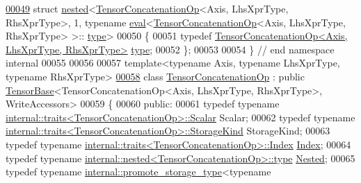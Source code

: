\begin{DoxyCode}
\hyperlink{struct_eigen_1_1internal_1_1nested_3_01_tensor_concatenation_op_3_01_axis_00_01_lhs_xpr_type_00_387f0c29001361c8d2e2fed7054a319e}{00049} \textcolor{keyword}{struct }\hyperlink{struct_eigen_1_1internal_1_1nested}{nested}<\hyperlink{class_eigen_1_1_tensor_concatenation_op}{TensorConcatenationOp}<Axis, LhsXprType, RhsXprType>, 1, typename 
      \hyperlink{struct_eigen_1_1internal_1_1eval}{eval}<\hyperlink{class_eigen_1_1_tensor_concatenation_op}{TensorConcatenationOp}<Axis, LhsXprType, RhsXprType> >::
      \hyperlink{class_eigen_1_1_tensor_concatenation_op}{type}>
00050 \{
00051   \textcolor{keyword}{typedef} \hyperlink{class_eigen_1_1_tensor_concatenation_op}{TensorConcatenationOp<Axis, LhsXprType, RhsXprType>}
       \hyperlink{class_eigen_1_1_tensor_concatenation_op}{type};
00052 \};
00053 
00054 \}  \textcolor{comment}{// end namespace internal}
00055 
00056 
00057 \textcolor{keyword}{template}<\textcolor{keyword}{typename} Axis, \textcolor{keyword}{typename} LhsXprType, \textcolor{keyword}{typename} RhsXprType>
\hyperlink{class_eigen_1_1_tensor_concatenation_op}{00058} \textcolor{keyword}{class }\hyperlink{class_eigen_1_1_tensor_concatenation_op}{TensorConcatenationOp} : \textcolor{keyword}{public} \hyperlink{class_eigen_1_1_tensor_base}{TensorBase}<TensorConcatenationOp<Axis, 
      LhsXprType, RhsXprType>, WriteAccessors>
00059 \{
00060   \textcolor{keyword}{public}:
00061     \textcolor{keyword}{typedef} \textcolor{keyword}{typename} \hyperlink{struct_eigen_1_1internal_1_1traits}{internal::traits<TensorConcatenationOp>::Scalar}
       Scalar;
00062     \textcolor{keyword}{typedef} \textcolor{keyword}{typename} \hyperlink{struct_eigen_1_1internal_1_1traits}{internal::traits<TensorConcatenationOp>::StorageKind}
       StorageKind;
00063     \textcolor{keyword}{typedef} \textcolor{keyword}{typename} \hyperlink{struct_eigen_1_1internal_1_1traits}{internal::traits<TensorConcatenationOp>::Index}
       \hyperlink{namespace_eigen_a62e77e0933482dafde8fe197d9a2cfde}{Index};
00064     \textcolor{keyword}{typedef} \textcolor{keyword}{typename} \hyperlink{class_eigen_1_1internal_1_1_tensor_lazy_evaluator_writable}{internal::nested<TensorConcatenationOp>::type}
       \hyperlink{class_eigen_1_1internal_1_1_tensor_lazy_evaluator_writable}{Nested};
00065     \textcolor{keyword}{typedef} \textcolor{keyword}{typename} \hyperlink{struct_eigen_1_1internal_1_1promote__storage__type}{internal::promote\_storage\_type}<\textcolor{keyword}{typename} 

\end{DoxyCode}
